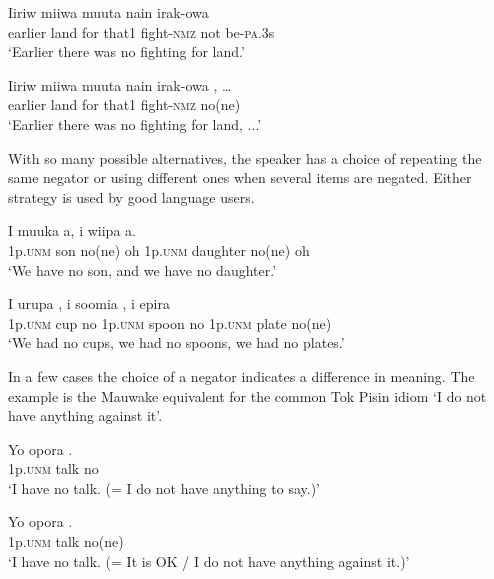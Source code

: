 \ea%
\label{ex:x1099}
\gll Iiriw  miiwa  muuta  nain  irak-owa     \\
earlier  land  for  that1  fight-\textsc{nmz}  not  be-\textsc{pa}.3s\\
\glt `Earlier there was no fighting for land.'
\z

\ea%
\label{ex:x1100}
\gll Iiriw  miiwa  muuta  nain  irak-owa  , {\dots} \\
earlier  land  for  that1  fight-\textsc{nmz}  no(ne)\\
\glt `Earlier there was no fighting for land, ...'
\z

With so many possible alternatives, the speaker has a choice of repeating the same negator or using different ones when several items are negated. Either strategy is used by good language users.

\ea%
\label{ex:x1128}
\gll I  muuka    a,  i  wiipa    a. \\
1p.\textsc{unm}  son  no(ne)  oh  1p.\textsc{unm}  daughter  no(ne)  oh\\
\glt `We have no son, and we have no daughter.'
\z

\ea%
\label{ex:x1127}
\gll I  urupa  ,  i  soomia  ,  i epira  \\
1p.\textsc{unm}  cup  no  1p.\textsc{unm}  spoon  no  1p.\textsc{unm} plate  no(ne)\\
\glt `We had no cups, we had no spoons, we had no plates.'
\z

In a few cases the choice of a negator indicates a difference in meaning. The example  is the Mauwake equivalent for the common Tok Pisin idiom  `I do not have anything against it'.

\ea%
\label{ex:x1129}
\gll Yo  opora  . \\
1p.\textsc{unm}  talk  no\\
\glt `I have no talk. (= I do not have anything to say.)'
\z

\ea%
\label{ex:x1130}
\gll Yo  opora  . \\
1p.\textsc{unm}  talk  no(ne)\\
\glt `I have no talk. (= It is OK / I do not have anything against it.)'
\z


